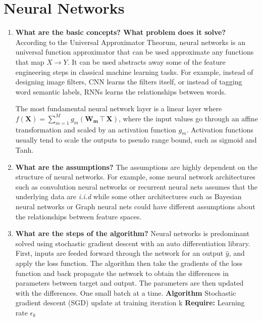 \documentclass{article}
\begin{document}
\begin{enumerate}
\end{enumerate}

\section{Neural Networks}
\noindent
\begin{enumerate}
    \item \textbf{What are the basic concepts? What problem does it solve?}
    \noindent 
    \smallbreak
    According to the Universal Approximator Theorum, neural networks is an universal function approximator that can be used approximate any functions that map $X \rightarrow Y$. It can be used abstracts away some of the feature engineering steps in classical machine learning tasks. For example, instead of designing image filters, CNN learns the filters itself, or instead of tagging word semantic labels, RNNs learns the relationships between words.
    
    The most fundamental neural network layer is a linear layer where $f(\mathbf{X}) = \sum_{m=1}^{M} g_m(\mathbf{W_m}\intercal\mathbf{X})$, where the input values go through an affine transformation and scaled by an activation function $g_m$. Activation functions usually tend to scale the outputs to pseudo range bound, such as sigmoid and Tanh. 

    \item \textbf{What are the assumptions?}
    \noindent 
    \smallbreak
    The assumptions are highly dependent on the structure of neural networks. For example, some neural network architectures such as convolution neural networks or recurrent neural nets assumes that the underlying data are \emph{i.i.d} while some other architectures such as Bayesian neural networks or Graph neural nets could have different assumptions about the relationships between feature spaces.
    
    \item \textbf{What are the steps of the algorithm?}
    \noindent 
    \smallbreak
    Neural networks is predominant solved using stochastic gradient descent with an auto differentiation library. First, inputs are feeded forward through the network for an output $\hat y$, and apply the loss function. The algorithm then take the gradients of the loss function and back propagate the network to obtain the differences in parameters between target and output. The parameters are then updated with the differences. One small batch at a time.
    \bigbreak
    \hline
    \noindent
    \textbf{Algorithm} Stochastic gradient descent (SGD) update at training iteration k \cite{2}
    \hline
    \smallbreak
    \textbf{Require:} Learning rate $\epsilon_k$
    

\end{enumerate}
\end{document}
